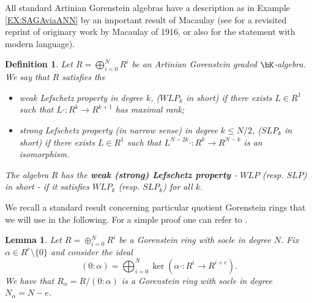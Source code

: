 \documentclass[a4paper,11pt]{amsart}
\newtheorem{lemma}[theorem]{Lemma}
\newtheorem{definition}[theorem]{Definition}
\begin{document}
All standard Artinian Gorenstein algebras have a description as in Example \ref{EX:SAGAviaANN} by an important result of Macaulay (see \cite{Mac94} for a revisited reprint of originary work by Macaulay of 1916, or also \cite[pag. 189]{Rus16} for the statement with modern language).

\begin{definition}
\label{DEF:LefProp}
Let $R=\bigoplus_{i=0}^NR^i$ be an Artinian Gorenstein graded $\bK$-algebra. We say that $R$ satisfies the 
\begin{itemize}
    \item weak Lefschetz property in degree $k$, ($WLP_k$ in short) if there exists $L\in R^1$ such that $L\cdot :R^k\to R^{k+1}$ has maximal rank;
    \item strong Lefschetz property (in narrow sense) in degree $k\leq N/2$, ($SLP_k$  in short) if there exists $L\in R^1$ such that $L^{N-2k}\cdot :R^k\to R^{N-k}$ is an isomorphism.
\end{itemize}
The algebra $R$ has the {\bf weak (strong) Lefschetz property} - $WLP$ (resp. $SLP$) in short - if it satisfies $WLP_k$ (resp. $SLP_k$) for all $k$.
\end{definition}

We recall a standard result concerning particular quotient Gorenstein rings that we will use in the following. For a simple proof one can refer to \cite{FP21}.

\begin{lemma} 
\label{LEM:RmodCOND}
Let $R=\oplus_{i=0}^N R^i$ be a Gorenstein ring with socle in degree $N$. Fix $\alpha\in R^e\setminus\{0\}$ and consider the ideal 
$$(0:\alpha)=\bigoplus_{i=0}^N\ker(\alpha\cdot :R^i\to R^{i+e}).$$
We have that $R_{\alpha}=R/(0:\alpha)$ is a Gorenstein ring with socle in degree $N_{\alpha}=N-e$. 
\end{lemma}

















\end{document}
